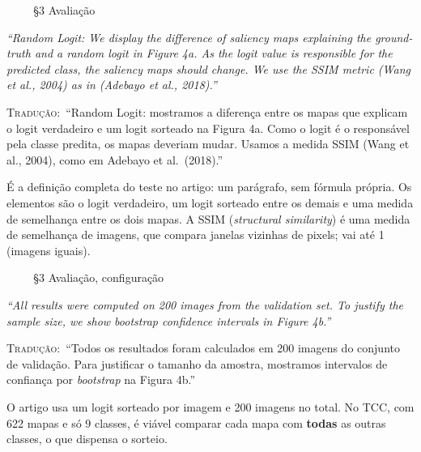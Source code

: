 \documentclass[11pt,a4paper]{article}
\newcommand{\pagechip}[1]{{\setlength{\fboxsep}{1.5pt}\colorbox{cAcc}{\textcolor{white}{\scriptsize\texttt{#1}}}}}
\newenvironment{origquote}{\par\itshape\small}{\par}
\newenvironment{tradquote}{\par\small\textsc{Tradução:}\ }{\par}
\newcommand{\explab}[1]{\par\smallskip{\small\color{cAcc}\textbf{\MakeUppercase{#1}}}\par}
\begin{document}
\begin{citacard}{\pagechip{p. 5} §3 Avaliação}
\begin{origquote}“Random Logit: We display the difference of saliency maps explaining the ground-truth and a random logit in Figure 4a. As the logit value is responsible for the predicted class, the saliency maps should change. We use the SSIM metric (Wang et al., 2004) as in (Adebayo et al., 2018).”\end{origquote}
\begin{tradquote}“Random Logit: mostramos a diferença entre os mapas que explicam o logit verdadeiro e um logit sorteado na Figura 4a. Como o logit é o responsável pela classe predita, os mapas deveriam mudar. Usamos a medida SSIM (Wang et al., 2004), como em Adebayo et al.\ (2018).”\end{tradquote}
\explab{Explicação}
É a definição completa do teste no artigo: um parágrafo, sem fórmula própria. Os elementos são o logit verdadeiro, um logit sorteado entre os demais e uma medida de semelhança entre os dois mapas. A SSIM (\textit{structural similarity}) é uma medida de semelhança de imagens, que compara janelas vizinhas de pixels; vai até 1 (imagens iguais).
\end{citacard}

\begin{citacard}{\pagechip{p. 5} §3 Avaliação, configuração}
\begin{origquote}“All results were computed on 200 images from the validation set. To justify the sample size, we show bootstrap confidence intervals in Figure 4b.”\end{origquote}
\begin{tradquote}“Todos os resultados foram calculados em 200 imagens do conjunto de validação. Para justificar o tamanho da amostra, mostramos intervalos de confiança por \textit{bootstrap} na Figura 4b.”\end{tradquote}
\explab{Explicação}
O artigo usa um logit sorteado por imagem e 200 imagens no total. No TCC, com 622 mapas e só 9 classes, é viável comparar cada mapa com \textbf{todas} as outras classes, o que dispensa o sorteio.
\end{citacard}
\end{document}
